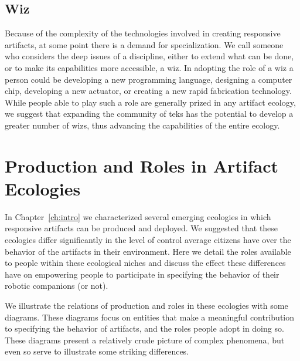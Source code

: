 \subsection{Wiz}
Because of the complexity of the technologies involved in creating responsive artifacts, at some point there is a demand for specialization. 
We call someone who considers the deep issues of a discipline, either to extend what can be done, or to make its capabilities more accessible, a wiz.
In adopting the role of a wiz a person could be developing a new programming language, designing a computer chip, developing a new actuator, or creating a new rapid fabrication technology. 
While people able to play such a role are generally prized in any artifact ecology, we suggest that expanding the community of teks has the potential to develop a greater number of wizs, thus advancing the capabilities of the entire ecology.

\section{Production and Roles in Artifact Ecologies}
\label{sec:artifact_ecologies}
%
In Chapter~\ref{ch:intro} we characterized several emerging ecologies in which responsive artifacts can be produced and deployed. We suggested that these ecologies differ significantly in the level of control average citizens have over the behavior of the artifacts in their environment. Here we detail the roles available to people within these ecological niches and discuss the effect these differences have on empowering people to participate in specifying the behavior of their robotic companions (or not).

We illustrate the relations of production and roles in these ecologies with some diagrams. These diagrams focus on entities that make a meaningful contribution to specifying the behavior of artifacts, and the roles people adopt in doing so. These diagrams present a relatively crude picture of complex phenomena, but even so serve to illustrate some striking differences.

